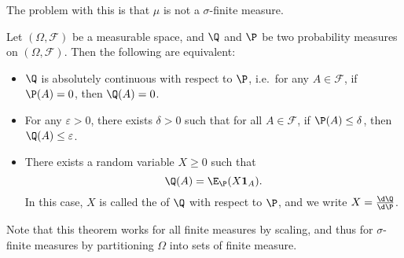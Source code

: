 \documentclass[a4paper]{article}
\begin{document}
The problem with this is that $\mu$ is not a $\sigma$-finite measure.

\begin{thm}
  Let $(\Omega, \mathcal{F})$ be a measurable space, and $\Q$ and $\P$ be two probability measures on $(\Omega, \mathcal{F})$. Then the following are equivalent:
  \begin{itemize}
    \item $\Q$ is absolutely continuous with respect to $\P$, i.e.\ for any $A \in \mathcal{F}$, if $\P(A) = 0$, then $\Q(A) = 0$.
    \item For any $\varepsilon > 0$, there exists $\delta > 0$ such that for all $A \in \mathcal{F}$, if $\P(A) \leq \delta$, then $\Q(A) \leq \varepsilon$.
    \item There exists a random variable $X \geq 0$ such that
      \[
        \Q(A) = \E_{\P}(X \mathbf{1}_A).
      \]
      In this case, $X$ is called the  of $\Q$ with respect to $\P$, and we write $X = \frac{\d \Q}{\d \P}$.
  \end{itemize}
\end{thm}
Note that this theorem works for all finite measures by scaling, and thus for $\sigma$-finite measures by partitioning $\Omega$ into sets of finite measure.
\end{document}
